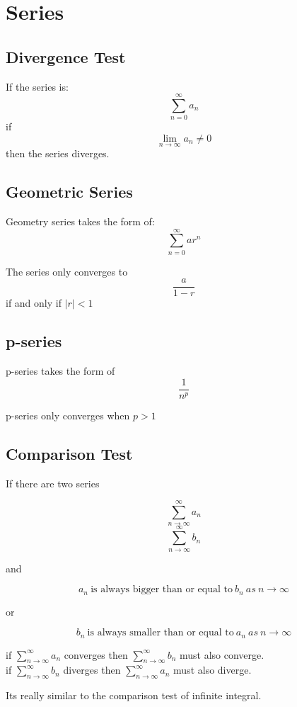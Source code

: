 \section{Series}
	\subsection{Divergence Test}
	If the series is:
	$$\sum^{\infty}_{n=0}a_n$$
	if
	$$\lim_{n\to\infty}a_n \neq 0$$
	then the series diverges. 
	
	\subsection{Geometric Series}
	Geometry series takes the form of:
	\begin{equation}
	\sum^{\infty}_{n=0}ar^n
	\end{equation}
	
	\noindent The series only converges to 
	\begin{equation}
	\frac{a}{1-r}
	\end{equation}
	if and only if $|r|<1$
	
	\subsection{p-series}
	p-series takes the form of
	\begin{equation}
	\frac{1}{n^p}
	\end{equation}
	
	\noindent p-series only converges when $p>1$
	
	\subsection{Comparison Test}
	\begin{theorem}{}{}
	If there are two series 
	\begin{multicols}{2}\noindent 
	\begin{equation}
	\displaystyle\sum^\infty_{n\to\infty}a_n
	\end{equation}
	\begin{equation}
	\displaystyle\sum^\infty_{n\to\infty}b_n
	\end{equation}
	\end{multicols}
	
	\noindent and
	
	$$a_n\ \text{is always bigger than or equal to}\ b_n\ as\ n\to\infty$$
	\begin{center}
	or
	\end{center}
	$$b_n\ \text{is always smaller than or equal to}\ a_n\ as\ n\to\infty$$
	
	\noindent if $\displaystyle\sum^{\infty}_{n\to\infty}a_n$ converges then $\displaystyle\sum^{\infty}_{n\to\infty}b_n$ must also converge.\\
	\noindent if $\displaystyle\sum^{\infty}_{n\to\infty}b_n$ diverges then $\displaystyle\sum^{\infty}_{n\to\infty}a_n$ must also diverge.
	\begin{tiny}
	\noindent Its really similar to the comparison test of infinite integral.
	\end{tiny}
	\end{theorem}
	
